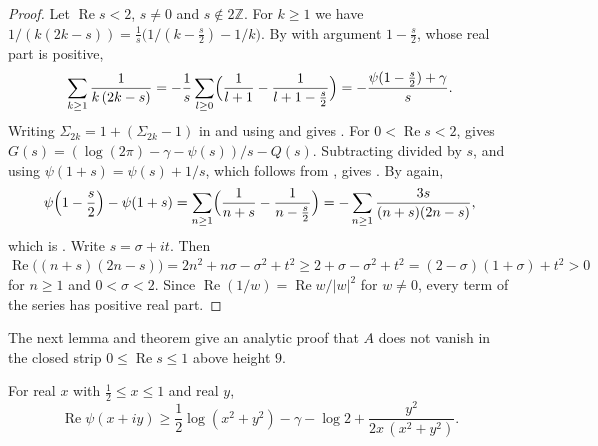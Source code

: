 \begin{proof}
Let $\operatorname{Re}s<2$, $s\ne0$ and $s\notin2\mathbb Z$. For $k\ge1$ we have $1/(k(2k-s))=\frac1s\bigl(1/(k-\frac s2)-1/k\bigr)$. By  with argument $1-\frac s2$, whose real part is positive,
\begin{equation}\label{eq:psihalf}
\sum_{k\ge1}\frac1{k\,(2k-s)}=-\frac1s\sum_{l\ge0}\Bigl(\frac1{l+1}-\frac1{l+1-\frac s2}\Bigr)=-\frac{\psi(1-\frac s2)+\gamma}{s} .
\end{equation}
Writing $\Sigma_{2k}=1+(\Sigma_{2k}-1)$ in  and using  and  gives . For $0<\operatorname{Re}s<2$,  gives $G(s)=(\log(2\pi)-\gamma-\psi(s))/s-Q(s)$. Subtracting  divided by $s$, and using $\psi(1+s)=\psi(s)+1/s$, which follows from , gives . By  again,
\begin{equation}\label{eq:psidiff}
\psi\Bigl(1-\frac s2\Bigr)-\psi(1+s)=\sum_{n\ge1}\Bigl(\frac1{n+s}-\frac1{n-\frac s2}\Bigr)=-\sum_{n\ge1}\frac{3s}{(n+s)(2n-s)},
\end{equation}
which is . Write $s=\sigma+it$. Then $\operatorname{Re}\bigl((n+s)(2n-s)\bigr)=2n^2+n\sigma-\sigma^2+t^2\ge2+\sigma-\sigma^2+t^2=(2-\sigma)(1+\sigma)+t^2>0$ for $n\ge1$ and $0<\sigma<2$. Since $\operatorname{Re}(1/w)=\operatorname{Re}w/|w|^2$ for $w\ne0$, every term of the series has positive real part.
\end{proof}

The next lemma and theorem give an analytic proof that $A$ does not vanish in the closed strip $0\le\operatorname{Re}s\le1$ above height $9$.

\begin{lemma}\label{lem:repsi}
For real $x$ with $\frac12\le x\le1$ and real $y$,
\begin{equation}\label{eq:repsi}
\operatorname{Re}\psi(x+iy)\ge\frac12\log(x^2+y^2)-\gamma-\log2+\frac{y^2}{2x\,(x^2+y^2)} .
\end{equation}
\end{lemma}


